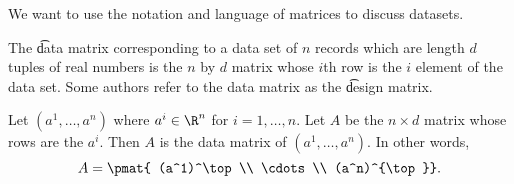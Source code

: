 

We want to use the notation and language of matrices to discuss datasets.


The \t{data matrix} corresponding to a data set of $n$ records which are length $d$ tuples of real numbers is the $n$ by $d$ matrix whose $i$th row is the $i$ element of the data set.
Some authors refer to the data matrix as the \t{design matrix}.


Let $(a^1, \dots, a^n)$ where $a^i \in \R^n$ for $i = 1, \dots, n$.
Let $A$ be the $n \times d$ matrix whose rows are the $a^i$.  Then $A$ is the data matrix of $(a^1, \dots, a^n)$.
In other words,
\[
  A = \pmat{ (a^1)^\top \\ \cdots \\ (a^n)^{\top}}.
\]

\blankpage
